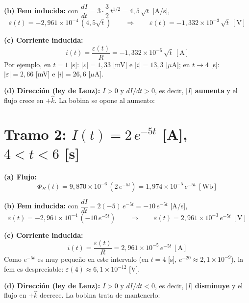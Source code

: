 \documentclass[12pt,letterpaper]{article}
\newcommand{\eps}{\varepsilon}
\begin{document}
\noindent\textbf{(b) Fem inducida:} con $\dfrac{dI}{dt} = 3\cdot\dfrac{3}{2}\,t^{1/2} = 4{,}5\,\sqrt{t}$ [A/s],
\[
    \eps(t) = -2{,}961\times10^{-4}\,(4{,}5\sqrt{t})
    \qquad\Longrightarrow\qquad
    \boxed{\eps(t) = -1{,}332\times10^{-3}\,\sqrt{t}\ [\text{V}]}
\]

\noindent\textbf{(c) Corriente inducida:}
\[
    \boxed{i(t) = \frac{\eps(t)}{R} = -1{,}332\times10^{-5}\,\sqrt{t}\ [\text{A}]}
\]
Por ejemplo, en $t = 1$ [s]: $|\eps| = 1{,}33$ [mV] e $|i| = 13{,}3$ [$\mu$A]; en $t\to4$ [s]:
$|\eps| = 2{,}66$ [mV] e $|i| = 26{,}6$ [$\mu$A].

\medskip
\noindent\textbf{(d) Direcci\'on (ley de Lenz):} $I > 0$ y $dI/dt > 0$, es decir, $|I|$
\textbf{aumenta} y el flujo crece en $+\hat{k}$. La bobina se opone al aumento:
\begin{center}
\end{center}

\section*{Tramo 2: $I(t) = 2\,e^{-5t}$ [A], \ $4 < t < 6$ [s]}

\noindent\textbf{(a) Flujo:}
\[
    \boxed{\Phi_B(t) = 9{,}870\times10^{-6}\,(2\,e^{-5t}) = 1{,}974\times10^{-5}\,e^{-5t}\ [\text{Wb}]}
\]

\noindent\textbf{(b) Fem inducida:} con $\dfrac{dI}{dt} = 2(-5)\,e^{-5t} = -10\,e^{-5t}$ [A/s],
\[
    \eps(t) = -2{,}961\times10^{-4}\,(-10\,e^{-5t})
    \qquad\Longrightarrow\qquad
    \boxed{\eps(t) = 2{,}961\times10^{-3}\,e^{-5t}\ [\text{V}]}
\]

\noindent\textbf{(c) Corriente inducida:}
\[
    \boxed{i(t) = \frac{\eps(t)}{R} = 2{,}961\times10^{-5}\,e^{-5t}\ [\text{A}]}
\]
Como $e^{-5t}$ es muy peque\~no en este intervalo (en $t = 4$ [s], $e^{-20}\approx 2{,}1\times10^{-9}$),
la fem es despreciable: $\eps(4)\approx 6{,}1\times10^{-12}$ [V].

\medskip
\noindent\textbf{(d) Direcci\'on (ley de Lenz):} $I > 0$ y $dI/dt < 0$, es decir, $|I|$
\textbf{disminuye} y el flujo en $+\hat{k}$ decrece. La bobina trata de mantenerlo:
\begin{center}
\end{center}
\end{document}
